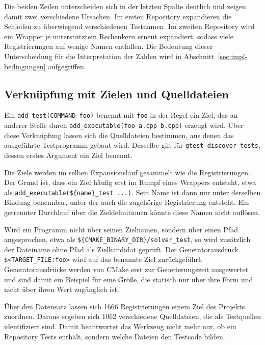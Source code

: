 \documentclass[12pt,a4paper,twoside,headsepline,parskip=half]{scrreprt}
\begin{document}
Die beiden Zeilen unterscheiden sich in der letzten Spalte deutlich und zeigen damit
zwei verschiedene Ursachen. Im ersten Repository expandieren die Schleifen zu
überwiegend verschiedenen Testnamen. Im zweiten Repository wird ein Wrapper je
unterstütztem Rechenkern erneut expandiert, sodass viele Registrierungen auf wenige
Namen entfallen. Die Bedeutung dieser Unterscheidung für die Interpretation der Zahlen
wird in Abschnitt~\ref{sec:impl-bedingungen} aufgegriffen.

\subsection{Verknüpfung mit Zielen und Quelldateien}
\label{sec:impl-targets}

Ein \texttt{add\_test(COMMAND foo)} benennt mit \texttt{foo} in der Regel ein Ziel,
das an anderer Stelle durch \texttt{add\_executable(foo a.cpp b.cpp)} erzeugt wird.
Über diese Verknüpfung lassen sich die Quelldateien bestimmen, aus denen das
ausgeführte Testprogramm gebaut wird. Dasselbe gilt für
\texttt{gtest\_discover\_tests}, dessen erstes Argument ein Ziel benennt.

Die Ziele werden im selben Expansionslauf gesammelt wie die Registrierungen. Der Grund
ist, dass ein Ziel häufig erst im Rumpf eines Wrappers entsteht, etwa als
\texttt{add\_executable(\$\{name\}\_test ...)}. Sein Name ist dann nur unter derselben
Bindung benennbar, unter der auch die zugehörige Registrierung entsteht. Ein
getrennter Durchlauf über die Zieldefinitionen könnte diese Namen nicht auflösen.

Wird ein Programm nicht über seinen Zielnamen, sondern über einen Pfad angesprochen,
etwa als \texttt{\$\{CMAKE\discretionary{}{}{}\_BINARY\discretionary{}{}{}\_DIR\}/solver\discretionary{}{}{}\_test}, so wird zusätzlich der
Dateiname ohne Pfad als Zielkandidat geprüft. Der Generatorausdruck
\texttt{\$<TARGET\_FILE:foo>} wird auf das benannte Ziel zurückgeführt.
Generatorausdrücke werden von CMake erst zur Generierungszeit ausgewertet und sind
damit ein Beispiel für eine Größe, die statisch nur über ihre Form und nicht über
ihren Wert zugänglich ist.

Über den Datensatz lassen sich 1666 Registrierungen einem Ziel des Projekts
zuordnen.
Daraus ergeben sich 1062 verschiedene Quelldateien, die als Testquellen identifiziert
sind. Damit beantwortet das Werkzeug nicht mehr nur, ob ein Repository Tests enthält,
sondern welche Dateien den Testcode bilden.
\end{document}
